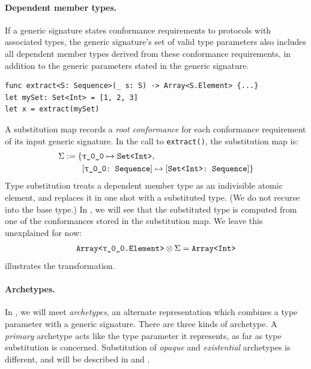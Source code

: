 \documentclass[../generics]{subfiles}
\begin{document}
\paragraph{Dependent member types.}
If a generic signature states conformance requirements to protocols with associated types, the generic signature's set of valid type parameters also includes all dependent member types derived from these conformance requirements, in addition to the generic parameters stated in the generic signature.
\begin{Verbatim}
func extract<S: Sequence>(_ s: S) -> Array<S.Element> {...}
let mySet: Set<Int> = [1, 2, 3]
let x = extract(mySet)
\end{Verbatim}
A substitution map records a \emph{root conformance} for each conformance requirement of its input generic signature. In the call to \texttt{extract()}, the substitution map is:
\begin{align*}
\Sigma := \{&\SubstType{\rT}{Set<Int>},\\
&\SubstConf{\rT}{Set<Int>}{Sequence}\}
\end{align*}
Type substitution treats a dependent member type as an indivisible atomic element, and replaces it in one shot with a substituted type. (We do not recurse into the base type.) In , we will see that the substituted type is computed from one of the conformances stored in the substitution map. We leave this unexplained for now:
\[ \texttt{Array<\rT.Element>} \otimes \Sigma = \texttt{Array<Int>} \]
 illustrates the transformation.

\paragraph{Archetypes.} In , we will meet \emph{archetypes}, an alternate representation which combines a type parameter with a generic signature. There are three kinds of archetype. A \emph{primary} archetype acts like the type parameter it represents, as far as type substitution is concerned. Substitution of \emph{opaque} and \emph{existential} archetypes is different, and will be described in  and .
\end{document}
